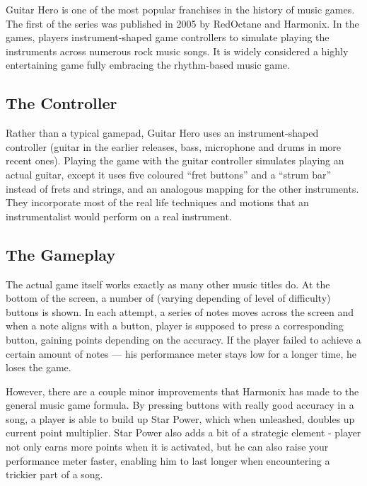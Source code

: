 Guitar Hero is one of the most popular franchises in the history of music games. The first of the series was published in 2005 by RedOctane and Harmonix. In the games, players instrument-shaped game controllers to simulate playing the instruments across numerous rock music songs. It is widely considered a highly entertaining game fully embracing the rhythm-based music game.

\vspace{10pt}


\subsection{The Controller}


Rather than a typical gamepad, Guitar Hero uses an instrument-shaped controller (guitar in the earlier releases, bass, microphone and drums in more recent ones). Playing the game with the guitar controller simulates playing an actual guitar, except it uses five coloured ``fret buttons'' and a ``strum bar'' instead of frets and strings, and an analogous mapping for the other instruments. They incorporate most of the real life techniques and motions that an instrumentalist would perform on a real instrument.

\vspace{10pt}


\subsection{The Gameplay}

The actual game itself works exactly as many other music titles do. At the bottom of the screen, a number of (varying depending of level of difficulty) buttons is shown. In each attempt, a series of notes moves across the screen and when a note aligns with a button, player is supposed to press a corresponding button, gaining points depending on the accuracy. If the player failed to achieve a certain amount of notes — his performance meter stays low for a longer time, he loses the game.

However, there are a couple minor improvements that Harmonix has made to the general music game formula. By pressing buttons with really good accuracy in a song, a player is able to build up Star Power, which when unleashed, doubles up current point multiplier. Star Power also adds a bit of a strategic element - player not only earns more points when it is activated, but he can also raise your performance meter faster, enabling him to last longer when encountering a trickier part of a song.

